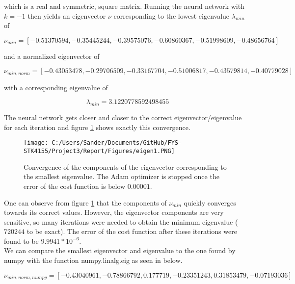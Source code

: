 \documentclass[12pt,a4paper]{article}
\begin{document}
\noindent which is a real and symmetric, square matrix. Running the neural network with $k = -1$ then yields an eigenvector $\nu$ corresponding to the lowest eigenvalue $\lambda_{min}$ of 

\begin{equation}\label{eq:minEigenVec}
\nu_{min}=[-0.51370594, -0.35445244, -0.39575076, -0.60860367, -0.51998609, -0.48656764]
\end{equation}

\noindent and a normalized eigenvector of

\begin{equation}\label{eq:minEigenVecNorm}
\nu_{min, norm}=[-0.43053478, -0.29706509, -0.33167704, -0.51006817, -0.43579814, -0.40779028]
\end{equation}

\noindent with a corresponding eigenvalue of 

\begin{equation}\label{eq:minEigenVal}
\lambda_{min} = 3.1220778592498455
\end{equation}

\noindent The neural network gets closer and closer to the correct eigenvector/eigenvalue for each iteration and figure \ref{fig:eigen1} shows exactly this convergence.

\begin{figure}[H]
\centering
\texttt{[image: C:/Users/Sander/Documents/GitHub/FYS-STK4155/Project3/Report/Figures/eigen1.PNG]}
\caption{\label{fig:eigen1} Convergence of the components of the eigenvector corresponding to the smallest eigenvalue. The Adam optimizer is stopped once the error of the cost function is below $0.00001$.}
\end{figure}

\noindent One can observe from figure \ref{fig:eigen1} that the components of $\nu_{min}$ quickly converges towards its correct values. However, the eigenvector components are very sensitive, so many iterations were needed to obtain the minimum eigenvalue ($720244$ to be exact). The error of the cost function after these iterations were found to be $9.9941 *10^{-6}$.
\\
We can compare the smallest eigenvector and eigenvalue to the one found by numpy with the function numpy.linalg.eig as seen in below.

\begin{equation}\label{eq:numpyEigenVec}
\nu_{min,norm,numpy} = [-0.43040961, -0.78866792, 0.177719, -0.23351243, 0.31853479, -0.07193036]
\end{equation}
\end{document}
